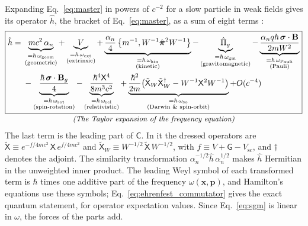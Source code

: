 \documentclass[aps,prd,onecolumn,tightenlines,nofootinbib,notitlepage,11pt,floatfix]{revtex4-2}
\theoremstyle{indentedtheorem}
\begin{document}
Expanding Eq.~\eqref{eq:master} in powers of $c^{-2}$ for a slow particle in weak fields gives its operator $\hat{h}$, the bracket of Eq.~\eqref{eq:master}, as a sum of eight terms \citep{HutchisonWavefn2026}:
\begin{equation}
    \begin{gathered}
    \boxed{\begin{aligned} \hat{h} = {} & \underbrace{mc^2 \, \alpha_n}_{\substack{= \hbar\,\omega_\text{geom} \\ \text{(geometric)}}} + \underbrace{V}_{\substack{= \hbar\,\omega_\text{ext} \\ \text{(extrinsic)}}} + \underbrace{\frac{\alpha_n}{4}\,\big\{m^{-1},W^{-1}\hat{\boldsymbol{\pi}}^2W^{-1}\big\}}_{\substack{= \hbar\,\omega_\text{kin} \\ \text{(kinetic)}}} - \underbrace{\hat{\Pi}_g}_{\substack{= \hbar\,\omega_\text{gm} \\ \text{(gravitomagnetic)}}} - \underbrace{\frac{\alpha_nq\hbar\,\boldsymbol{\sigma}\cdot\mathbf{B}}{2mW^2}}_{\substack{= \hbar\,\omega_\text{Pauli} \\ \text{(Pauli)}}} \\ & - \underbrace{\frac{\hbar\,\boldsymbol{\sigma}\cdot\mathbf{B}_g}{4}}_{\substack{= \hbar\,\omega_\text{rot} \\ \text{(spin-rotation)}}} - \underbrace{\frac{\hbar^4\mathsf{X}^4}{8m^3c^2}}_{\substack{= \hbar\,\omega_\text{rel} \\ \text{(relativistic)}}} + \underbrace{\frac{\hbar^2}{2m}\big(\tilde{\mathsf{X}}_W\tilde{\mathsf{X}}_W^\dagger-W^{-1}\mathsf{X}^2W^{-1}\big)}_{\substack{= \hbar\,\omega_\text{so} \\ \text{(Darwin \& spin-orbit)}}} + O(c^{-4}) \end{aligned}} \\[-3pt]
    \text{\small\itshape (The Taylor expansion of the frequency equation)}
    \end{gathered}
    \label{eq:nr_expansion}
\end{equation}
The last term is the leading part of $\mathsf{C}$. In it the dressed operators are $\tilde{\mathsf{X}}\equiv e^{-f/4mc^2}\,\mathsf{X}\,e^{f/4mc^2}$ and $\tilde{\mathsf{X}}_W\equiv W^{-1/2}\,\tilde{\mathsf{X}}\,W^{-1/2}$, with $f\equiv\hat{V}+\mathsf{G}-V_\text{sc}$, and $\dagger$ denotes the adjoint. The similarity transformation $\alpha_n^{-1/2}\hat{h}\,\alpha_n^{1/2}$ makes $\hat{h}$ Hermitian in the unweighted inner product. The leading Weyl symbol of each transformed term is $\hbar$ times one additive part of the frequency $\omega(\mathbf{x},\mathbf{p})$, and Hamilton's equations use these symbols; Eq.~\eqref{eq:ehrenfest_commutator} gives the exact quantum statement, for operator expectation values. Since Eq.~\eqref{eq:sgm} is linear in $\omega$, the forces of the parts add.
\end{document}
